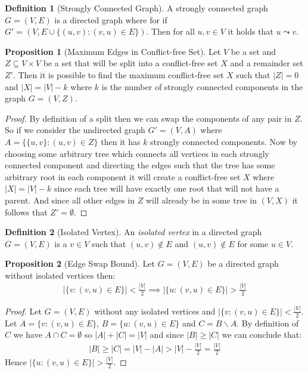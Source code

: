\documentclass[a4paper,12pt]{article}
\theoremstyle{definition}
\newtheorem{definition}{Definition}[section]
\newtheorem{proposition}{Proposition}[section]
\begin{document}
\begin{definition}[Strongly Connected Graph]
    A strongly connected graph $G = (V, E)$ is a directed graph where for if $G'
    = (V, E \cup \{(u, v) : (v, u) \in E\})$. Then for all $u, v \in V$ it holds
    that $u \leadsto v$.
\end{definition}

\begin{proposition}[Maximum Edges in Conflict-free Set]
    Let $V$ be a set and $Z \subseteq V \times V$ be a set that will be split into
    a conflict-free set $X$ and a remainder set $Z'$. Then it is possible to
    find the maximum conflict-free set $X$ such that $|Z| = 0$ and $|X| = |V| -
    k$ where $k$ is the number of strongly connected components in the graph
    $G = (V, Z)$.
\end{proposition}

\begin{proof}
    By definition of a split then we can swap the components of any pair in $Z$.
    So if we consider the undirected graph $G' = (V, A)$ where $A = \{\{u, v\} :
    (u, v) \in Z\}$ then it has $k$ strongly connected components. Now by
    choosing some arbitrary tree which connects all vertices in each strongly
    connected component and directing the edges such that the tree has some
    arbitrary root in each component it will create a conflict-free set $X$
    where $|X| = |V| - k$ since each tree will have exactly one root that will
    not have a parent. And since all other edges in $Z$ will already be in some
    tree in $(V, X)$ it follows that $Z' = \emptyset$.
\end{proof}

\begin{definition}[Isolated Vertex]
    An \emph{isolated vertex} in a directed graph $G = (V, E)$ is a $v \in V$
    such that $(u, v) \notin E$ and $(u, v) \notin E$ for some $u \in V$.
\end{definition}

\begin{proposition}[Edge Swap Bound]
    Let $G = (V, E)$ be a directed graph without isolated vertices then:
    \begin{align*}
        |\{v : (v, u) \in E\}| < \frac{|V|}{2} \implies |\{u : (v, u) \in E\}| > \frac{|V|}{2} 
    \end{align*}
\end{proposition}
\begin{proof}
    Let $G = (V, E)$ without any isolated vertices and $|\{v : (v, u) \in E\}| < \frac{|V|}{2}$.
    Let $A = \{v : (v, u) \in E\}$, $B = \{u : (v, u) \in E\}$ and $C = B \backslash A$.
    By definition of $C$ we have $A \cap C = \emptyset$ so $|A| + |C| = |V|$ and since $|B| \geq |C|$ we can conclude that:
    \begin{align*}
        |B| \geq |C| = |V| - |A| > |V| - \frac{|V|}{2} = \frac{|V|}{2}
    \end{align*}
    Hence $|\{u : (v, u) \in E\}| > \frac{|V|}{2}$.
\end{proof}
\end{document}
